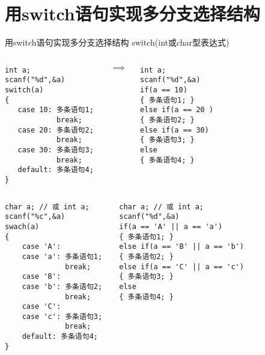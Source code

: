 
\section{用switch语句实现多分支选择结构}

\begin{frame}{用switch语句实现多分支选择结构}
switch(int或char型表达式)
\begin{columns}[T]
\begin{lstlisting}
int a;
scanf("%d",&a)
switch(a)
{
   case 10: 多条语句1; 
            break;
   case 20: 多条语句2; 
            break;
   case 30: 多条语句3; 
            break;
   default: 多条语句4;
}
\end{lstlisting}
\vspace{3cm}
$\implies$
\begin{lstlisting}
int a;
scanf("%d",&a)
if(a == 10)
{ 多条语句1; } 
else if(a == 20 )
{ 多条语句2; } 
else if(a == 30) 
{ 多条语句3; }
else
{ 多条语句4; }
\end{lstlisting}
\end{columns}
\end{frame}

\begin{frame}
\begin{columns}[T]
\begin{lstlisting}
char a; // 或 int a;
scanf("%c",&a)
swach(a)
{
    case 'A':
    case 'a': 多条语句1; 
              break;
    case 'B':
    case 'b': 多条语句2; 
              break;
    case 'C':
    case 'c': 多条语句3; 
              break;
    default: 多条语句4;
}
\end{lstlisting}
\begin{lstlisting}	
char a; // 或 int a;
scanf("%d",&a)
if(a == 'A' || a == 'a')
{ 多条语句1; } 
else if(a == 'B' || a == 'b')
{ 多条语句2; } 
else if(a == 'C' || a == 'c') 
{ 多条语句3; }
else
{ 多条语句4; }
\end{lstlisting}
\end{columns}
\end{frame}

